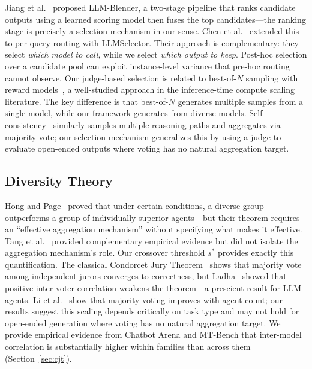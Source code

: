 \documentclass[10pt,twocolumn]{article}
\theoremstyle{remark}
\begin{document}
Jiang et al.~\cite{jiang2023llmblender} proposed LLM-Blender, a two-stage pipeline that ranks candidate outputs using a learned scoring model then fuses the top candidates---the ranking stage is precisely a selection mechanism in our sense. Chen et al.~\cite{chen2025llmselector} extended this to per-query routing with LLMSelector. Their approach is complementary: they select \emph{which model to call}, while we select \emph{which output to keep}. Post-hoc selection over a candidate pool can exploit instance-level variance that pre-hoc routing cannot observe. Our judge-based selection is related to best-of-$N$ sampling with reward models~\citep{stiennon2020learning, snell2024scaling}, a well-studied approach in the inference-time compute scaling literature. The key difference is that best-of-$N$ generates multiple samples from a single model, while our framework generates from diverse models. Self-consistency~\cite{wang2023selfconsistency} similarly samples multiple reasoning paths and aggregates via majority vote; our selection mechanism generalizes this by using a judge to evaluate open-ended outputs where voting has no natural aggregation target.

\subsection{Diversity Theory}

Hong and Page~\cite{hong2004groups} proved that under certain conditions, a diverse group outperforms a group of individually superior agents---but their theorem requires an ``effective aggregation mechanism'' without specifying what makes it effective. Tang et al.~\cite{tang2026value} provided complementary empirical evidence but did not isolate the aggregation mechanism's role. Our crossover threshold $s^*$ provides exactly this quantification. The classical Condorcet Jury Theorem~\cite{condorcet1785essai} shows that majority vote among independent jurors converges to correctness, but Ladha~\cite{ladha1992condorcet} showed that positive inter-voter correlation weakens the theorem---a prescient result for LLM agents. Li et al.~\citep{li2024more} show that majority voting improves with agent count; our results suggest this scaling depends critically on task type and may not hold for open-ended generation where voting has no natural aggregation target. We provide empirical evidence from Chatbot Arena and MT-Bench that inter-model correlation is substantially higher within families than across them (Section~\ref{sec:cjt}).
\end{document}
